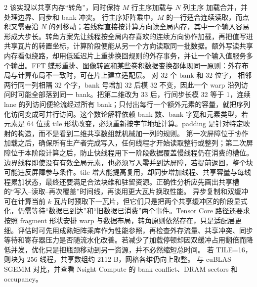 \begin{solutionexercise}{2}
\conclusionheading 该实现以共享内存“转角”，同时保持 $M$ 行主序加载与 $N$ 列主序
加载合并，并处理边界、同步和 bank 冲突。
\discussionheading
{}
行主序矩阵乘中，$M$ 的一行适合连续读取，而点积又需要沿 $N$ 的列移动；若线程直接按计算方向读全局内存，其中一个输入容易形成大步长。转角方案先让线程按全局内存喜欢的连续方向协作加载，再把值写进共享瓦片的转置坐标，计算阶段便能从另一个方向读取同一批数据。额外写读共享内存看似绕路，却用低延迟片上重排换回规则的外存事务，并让一个输入值服务多个输出。FFT 蝶形重排、图像转置和某些卷积数据变换都体现同一原则：外存布局与计算布局不一致时，可在片上建立适配层。
对 32 个 bank 和 32 位字， 相邻两行同一列相隔 32 个字，bank 号增加 32 后模 32 不变，因此一个 warp 沿列访问时可能全部落到同一 bank。把第二维改为 33 后，行间步长模 32 等于 1，连续 lane 的列访问便轮流经过所有 bank；只付出每行一个额外元素的容量，就把序列化访问变成可并行访问。这个数论解释依赖 bank 数、bank 字宽和元素类型，若元素是 64 位或 tile 形状改变，必须重新按字节地址计算。padding 是针对特定映射的构造，而不是看到二维共享数组就机械加一列的规则。
第一次屏障位于协作加载之后，确保所有生产者完成写入，任何线程才开始读取整行或整列；第二次屏障位于本阶段计算之后，防止快线程用下一阶段数据覆盖慢线程仍在消费的槽位。边界线程即使没有有效全局元素，也必须写入零并到达屏障，若提前返回，整个块可能违反屏障参与条件。tile 增大能提高复用，却同步增加线程、共享容量与每线程累加状态，最终还要满足合法块维和驻留资源。正确性分析应先画出共享槽的“写入--读取--再次覆盖”时间线，再谈用更大瓦片换取性能。
异步复制和双缓冲可在计算当前 $k$ 瓦片时预取下一瓦片，但它们只是把两个共享缓冲区的阶段显式化，仍需等待“数据已到达”和“旧数据已消费”两个事件。Tensor Core 路径还要求按照 fragment 形状安排 warp 与数据布局，转角原则依然存在，只是适配层更细。评估时可先用成熟矩阵乘库作为性能参照，再检查外存流量、共享冲突、同步等待和寄存器压力是否随流水化改善。若减少了加载停顿却因双缓冲占用翻倍而降低并发，优化只是把瓶颈移动到另一资源，并不必然缩短总时间。
\variantheading 若 TILE=16，则块为 256 线程，共享数组约 2112 B，网格各维仍向上取整。
\practiceheading 与 cuBLAS SGEMM 对比，并查看 Nsight Compute 的 bank conflict、DRAM sectors 和 occupancy。
\end{solutionexercise}

